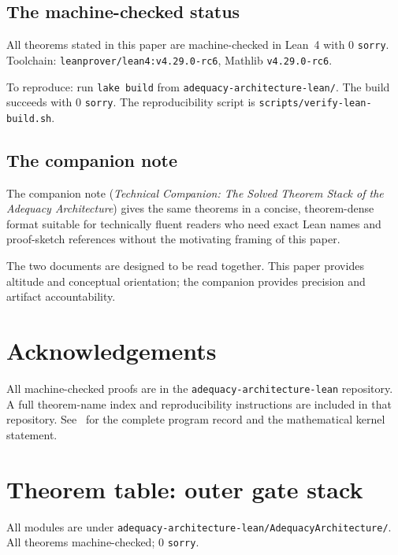 \documentclass[11pt]{article}
\theoremstyle{plain}
\theoremstyle{definition}
\theoremstyle{remark}
\newcommand{\lean}[1]{\texttt{\small #1}}
\begin{document}
\subsection{The machine-checked status}

All theorems stated in this paper are machine-checked in Lean~4 with 0
\texttt{sorry}.  Toolchain: \lean{leanprover/lean4:v4.29.0-rc6}, Mathlib
\lean{v4.29.0-rc6}.

To reproduce: run \lean{lake build} from
\lean{adequacy-architecture-lean/}.  The build succeeds with 0 \texttt{sorry}.
The reproducibility script is \lean{scripts/verify-lean-build.sh}.

\subsection{The companion note}

The companion note (\emph{Technical Companion: The Solved Theorem Stack of
the Adequacy Architecture}) gives the same theorems in a concise,
theorem-dense format suitable for technically fluent readers who need exact
Lean names and proof-sketch references without the motivating framing of
this paper.

The two documents are designed to be read together.  This paper provides
altitude and conceptual orientation; the companion provides precision and
artifact accountability.

\section*{Acknowledgements}

All machine-checked proofs are in the \texttt{adequacy-architecture-lean}
repository.  A full theorem-name index and reproducibility instructions
are included in that repository.  See~\cite{SpivackAdequacy} for the
complete program record and the mathematical kernel statement.

\appendix

\section{Theorem table: outer gate stack}
\label{sec:thmtable}

All modules are under
\texttt{adequacy-architecture-lean/AdequacyArchitecture/}.
All theorems machine-checked; 0 \texttt{sorry}.
\end{document}
